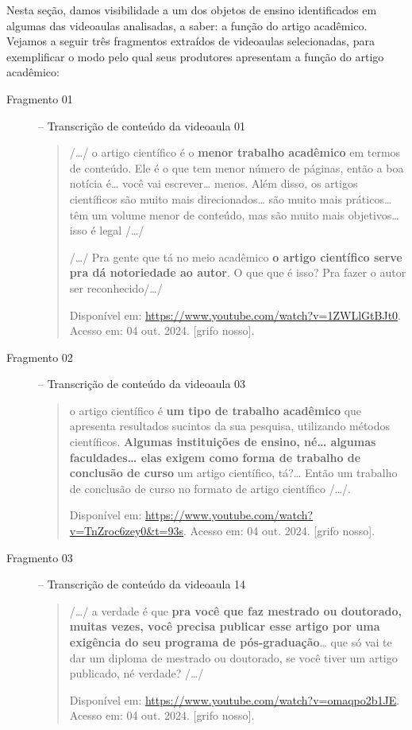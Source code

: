 Nesta seção, damos visibilidade a um dos objetos de ensino identificados
em algumas das videoaulas analisadas, a saber: a função do artigo
acadêmico. Vejamos a seguir três fragmentos extraídos de videoaulas
selecionadas, para exemplificar o modo pelo qual seus produtores
apresentam a função do artigo acadêmico:

\begin{description}
    \item[Fragmento 01\label{frag01}] -- Transcrição de conteúdo da videoaula 01 

    \begin{quote}
    /\ldots/ o artigo científico é o \textbf{menor trabalho acadêmico} em
termos de conteúdo. Ele é o que tem menor número de páginas, então a boa
notícia é\ldots{} você vai escrever\ldots{} menos. Além disso, os
artigos científicos são muito mais direcionados\ldots{} são muito mais
práticos\ldots{} têm um volume menor de conteúdo, mas são muito mais
objetivos\ldots{} isso é legal /\ldots/

    /\ldots/ Pra gente que tá no meio acadêmico \textbf{o artigo científico
serve pra dá notoriedade ao autor}. O que que é isso? Pra fazer o autor
ser reconhecido/\ldots/

    Disponível em: \url{https://www.youtube.com/watch?v=1ZWLlGtBJt0}. Acesso
em: 04 out. 2024. {[}grifo nosso{]}.
    \end{quote}

    \item[Fragmento 02\label{frag02}] -- Transcrição de conteúdo da videoaula 03

    \begin{quote}
    o artigo científico é \textbf{um tipo de trabalho acadêmico} que
apresenta resultados sucintos da sua pesquisa, utilizando métodos
científicos. \textbf{Algumas instituições de ensino, né\ldots{} algumas
faculdades\ldots{} elas exigem como forma de trabalho de conclusão de
curso} um artigo científico, tá?\ldots{} Então um trabalho de conclusão
de curso no formato de artigo científico /\ldots/.

    Disponível em: \url{https://www.youtube.com/watch?v=TnZroc6zey0\&t=93s}.
Acesso em: 04 out. 2024. {[}grifo nosso{]}.
    \end{quote}

    \item[Fragmento 03\label{frag03}] -- Transcrição de conteúdo da videoaula 14

    \begin{quote}
    /\ldots/ a verdade é que \textbf{pra você que faz mestrado ou doutorado,
muitas vezes, você precisa publicar esse artigo por uma exigência do seu
programa de pós-graduação}\ldots{} que só vai te dar um diploma de
mestrado ou doutorado, se você tiver um artigo publicado, né verdade?
/\ldots/

    Disponível em: \url{https://www.youtube.com/watch?v=omaqpo2b1JE}. Acesso
em: 04 out. 2024. {[}grifo nosso{]}.
    \end{quote}
\end{description}
